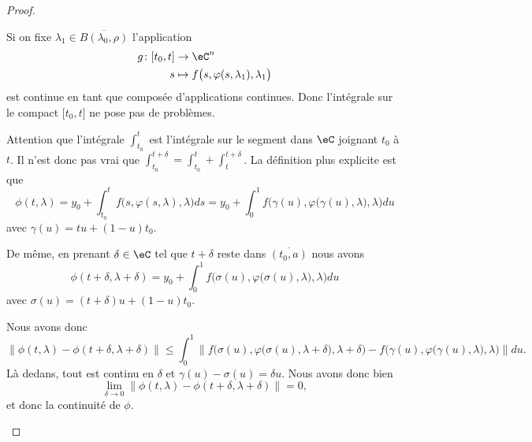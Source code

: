 \begin{proof}
\begin{subproof}
		Si on fixe \( \lambda_1\in \overline{B(\lambda_0,\rho)}\) l'application
		\begin{equation}
			\begin{aligned}
				g\colon \mathopen[ t_0,t\mathclose] & \to \eC^n                                             \\
				s                                   & \mapsto f\big( s,\varphi(s,\lambda_1),\lambda_1 \big)
			\end{aligned}
		\end{equation}
		est continue en tant que composée d'applications continues. Donc l'intégrale sur le compact \( \mathopen[ t_0,t\mathclose]\) ne pose pas de problèmes.

		Attention que l'intégrale \( \int_{t_0}^t\) est l'intégrale sur le segment dans \( \eC\) joignant \( t_0\) à \( t\). Il n'est donc pas vrai que \( \int_{t_0}^{t+\delta}=\int_{t_0}^t+\int_t^{t+\delta}\). La définition plus explicite est que
		\begin{equation}
			\phi(t,\lambda)=y_0+\int_{t_0}^tf\big( s,\varphi(s,\lambda),\lambda \big)ds=y_0+\int_{0}^1f\Big( \gamma(u),\varphi\big( \gamma(u),\lambda \big),\lambda  \Big)du
		\end{equation}
		avec \( \gamma(u)=tu+(1-u)t_0\).

		De même, en prenant \( \delta\in \eC\) tel que \( t+\delta\) reste dans \( \overline{(t_0,a)}\) nous avons
		\begin{equation}
			\phi(t+\delta,\lambda+\delta)=y_0+\int_0^1f\Big( \sigma(u),\varphi\big( \sigma(u),\lambda \big),\lambda \Big)du
		\end{equation}
		avec \( \sigma(u)=(t+\delta)u+(1-u)t_0\).

		Nous avons donc
		\begin{equation}
			\| \phi(t,\lambda)-\phi(t+\delta,\lambda+\delta) \|\leq \int_{0}^1\| f\Big( \sigma(u),\varphi\big( \sigma(u),\lambda+\delta \big),\lambda+\delta \Big)-f\Big( \gamma(u),\varphi\big( \gamma(u),\lambda \big),\lambda \Big) \|du.
		\end{equation}
		Là dedans, tout est continu en \( \delta\) et \( \gamma(u)-\sigma(u)=\delta u\). Nous avons donc bien
		\begin{equation}
			\lim_{\delta\to 0}\| \phi(t,\lambda)-\phi(t+\delta,\lambda+\delta) \|=0,
		\end{equation}
		et donc la continuité de \( \phi\).


\end{subproof}
\end{proof}
